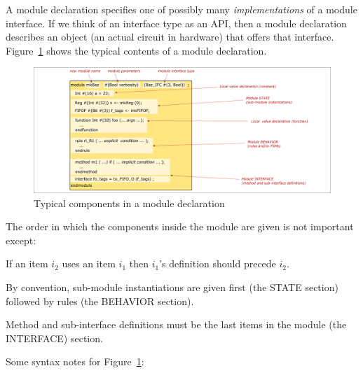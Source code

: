 \label{Sec_Whats_in_a_module_declaration}


A module declaration specifies one of possibly many
\emph{implementations} of a module interface.  If we think of an
interface type as an API, then a module declaration describes an
object (an actual circuit in hardware) that offers that interface.
Figure~\ref{Fig_BSV_whats_in_a_module_decl} shows the typical contents
of a module declaration.
\begin{figure}[htbp]
  \centerline{\includegraphics[width=6in,angle=0]{Figures/Fig_BSV_whats_in_a_module_decl}}
  \caption{\label{Fig_BSV_whats_in_a_module_decl}
           Typical components in a module declaration}
\end{figure}

The order in which the components inside the module are given is not
important except:

\begin{tightlist}

 \item If an item $i_2$ uses an item $i_1$ then $i_1$'s definition
       should precede $i_2$.

 \item By convention, sub-module instantiations are given first (the STATE section)
       followed by rules (the BEHAVIOR section).

 \item Method and sub-interface definitions must be the last items in
       the module (the INTERFACE) section.

\end{tightlist}

Some syntax notes for Figure~\ref{Fig_BSV_whats_in_a_module_decl}:


